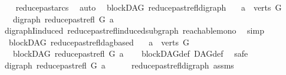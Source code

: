 \begin{isabellebody}
%
\isadelimproof
\ \ %
\endisadelimproof
%
\isatagproof
{}\isamarkupfalse%
\ reduce{\isacharunderscore}{\kern0pt}past{\isacharunderscore}{\kern0pt}arcs\ \isamarkupfalse%
\ auto%
\endisatagproof
{\isafoldproof}%
%
\isadelimproof
\isanewline
%
\endisadelimproof
\isanewline
{}\isamarkupfalse%
\ {\isacharparenleft}{\kern0pt}\ blockDAG{\isacharparenright}{\kern0pt}\ reduce{\isacharunderscore}{\kern0pt}past{\isacharunderscore}{\kern0pt}refl{\isacharunderscore}{\kern0pt}digraph{\isacharcolon}{\kern0pt}\isanewline
\ \ \ {\isachardoublequoteopen}a\ {\isasymin}\ verts\ G{\isachardoublequoteclose}\isanewline
\ \ \ {\isachardoublequoteopen}digraph\ {\isacharparenleft}{\kern0pt}reduce{\isacharunderscore}{\kern0pt}past{\isacharunderscore}{\kern0pt}refl\ G\ a{\isacharparenright}{\kern0pt}{\isachardoublequoteclose}\isanewline
%
\isadelimproof
\ \ %
\endisadelimproof
%
\isatagproof
{}\isamarkupfalse%
\ digraphI{\isacharunderscore}{\kern0pt}induced\ reduce{\isacharunderscore}{\kern0pt}past{\isacharunderscore}{\kern0pt}refl{\isacharunderscore}{\kern0pt}induced{\isacharunderscore}{\kern0pt}subgraph\ reachable{\isacharunderscore}{\kern0pt}mono\ \isamarkupfalse%
\ simp%
\endisatagproof
{\isafoldproof}%
%
\isadelimproof
\isanewline
%
\endisadelimproof
\isanewline
{}\isamarkupfalse%
\ {\isacharparenleft}{\kern0pt}\ blockDAG{\isacharparenright}{\kern0pt}\ reduce{\isacharunderscore}{\kern0pt}past{\isacharunderscore}{\kern0pt}refl{\isacharunderscore}{\kern0pt}dagbased{\isacharcolon}{\kern0pt}\isanewline
\ \ \ {\isachardoublequoteopen}a\ {\isasymin}\ verts\ G{\isachardoublequoteclose}\isanewline
\ \ \ {\isachardoublequoteopen}blockDAG\ {\isacharparenleft}{\kern0pt}reduce{\isacharunderscore}{\kern0pt}past{\isacharunderscore}{\kern0pt}refl\ G\ a{\isacharparenright}{\kern0pt}{\isachardoublequoteclose}\isanewline
%
\isadelimproof
\ \ %
\endisadelimproof
%
\isatagproof
{}\isamarkupfalse%
\ blockDAG{\isacharunderscore}{\kern0pt}def\ DAG{\isacharunderscore}{\kern0pt}def\ \isanewline
{}\isamarkupfalse%
\ safe\isanewline
\ \ \isamarkupfalse%
\ {\isachardoublequoteopen}digraph\ {\isacharparenleft}{\kern0pt}reduce{\isacharunderscore}{\kern0pt}past{\isacharunderscore}{\kern0pt}refl\ G\ a{\isacharparenright}{\kern0pt}{\isachardoublequoteclose}\isanewline
\ \ \ \ \isamarkupfalse%
\ reduce{\isacharunderscore}{\kern0pt}past{\isacharunderscore}{\kern0pt}refl{\isacharunderscore}{\kern0pt}digraph\ assms{\isacharparenleft}{\kern0pt}{}{\isacharparenright}{\kern0pt}\ \isamarkupfalse%

\end{isabellebody}
